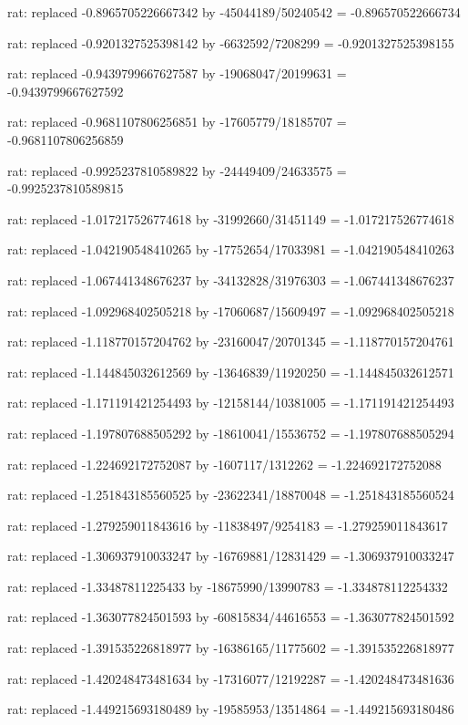\documentclass[a4paper,10pt]{article}
\begin{document}
\begin{eulernotebook}
\begin{eulercomment}
\begin{eulercomment}
\begin{eulercomment}
\begin{eulercomment}
\begin{eulercomment}
\begin{eulercomment}
\begin{eulercomment}
\begin{eulercomment}
\begin{eulercomment}
\begin{eulercomment}
\begin{eulercomment}
\begin{eulercomment}
\begin{eulercomment}
\begin{eulercomment}
\begin{eulercomment}
\begin{eulercomment}
\begin{euleroutput}
  rat: replaced -0.8965705226667342 by -45044189/50240542 = -0.896570522666734
  
  rat: replaced -0.9201327525398142 by -6632592/7208299 = -0.9201327525398155
  
  rat: replaced -0.9439799667627587 by -19068047/20199631 = -0.9439799667627592
  
  rat: replaced -0.9681107806256851 by -17605779/18185707 = -0.9681107806256859
  
  rat: replaced -0.9925237810589822 by -24449409/24633575 = -0.9925237810589815
  
  rat: replaced -1.017217526774618 by -31992660/31451149 = -1.017217526774618
  
  rat: replaced -1.042190548410265 by -17752654/17033981 = -1.042190548410263
  
  rat: replaced -1.067441348676237 by -34132828/31976303 = -1.067441348676237
  
  rat: replaced -1.092968402505218 by -17060687/15609497 = -1.092968402505218
  
  rat: replaced -1.118770157204762 by -23160047/20701345 = -1.118770157204761
  
  rat: replaced -1.144845032612569 by -13646839/11920250 = -1.144845032612571
  
  rat: replaced -1.171191421254493 by -12158144/10381005 = -1.171191421254493
  
  rat: replaced -1.197807688505292 by -18610041/15536752 = -1.197807688505294
  
  rat: replaced -1.224692172752087 by -1607117/1312262 = -1.224692172752088
  
  rat: replaced -1.251843185560525 by -23622341/18870048 = -1.251843185560524
  
  rat: replaced -1.279259011843616 by -11838497/9254183 = -1.279259011843617
  
  rat: replaced -1.306937910033247 by -16769881/12831429 = -1.306937910033247
  
  rat: replaced -1.33487811225433 by -18675990/13990783 = -1.334878112254332
  
  rat: replaced -1.363077824501593 by -60815834/44616553 = -1.363077824501592
  
  rat: replaced -1.391535226818977 by -16386165/11775602 = -1.391535226818977
  
  rat: replaced -1.420248473481634 by -17316077/12192287 = -1.420248473481636
  
  rat: replaced -1.449215693180489 by -19585953/13514864 = -1.449215693180486
  

\end{euleroutput}
\end{eulercomment}
\end{eulercomment}
\end{eulercomment}
\end{eulercomment}
\end{eulercomment}
\end{eulercomment}
\end{eulercomment}
\end{eulercomment}
\end{eulercomment}
\end{eulercomment}
\end{eulercomment}
\end{eulercomment}
\end{eulercomment}
\end{eulercomment}
\end{eulercomment}
\end{eulercomment}
\end{eulernotebook}
\end{document}
